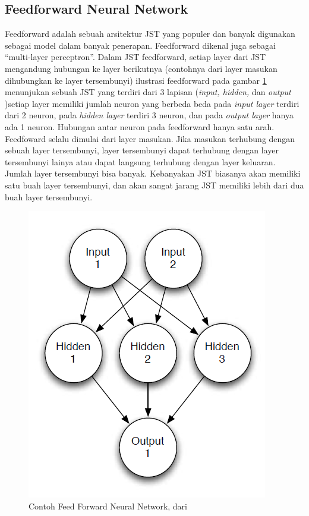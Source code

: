 \subsection{Feedforward Neural Network}
Feedforward adalah sebuah arsitektur JST yang populer dan banyak digunakan sebagai model dalam banyak penerapan. Feedforward dikenal juga sebagai ``multi-layer perceptron''. Dalam JST feedforward, setiap layer dari JST mengandung hubungan ke layer berikutnya (contohnya dari layer masukan dihubungkan ke layer tersembunyi) ilustrasi feedforward pada gambar \ref{fig:ffnn} menunjukan sebuah JST yang terdiri dari 3 lapisan (\textit{input, hidden,} dan \textit{output} )setiap layer memiliki jumlah neuron yang berbeda beda pada \textit{input layer} terdiri dari 2 neuron, pada \textit{hidden layer} terdiri 3 neuron, dan pada \textit{output layer} hanya ada 1 neuron. Hubungan antar neuron pada feedforward hanya satu arah. Feedfoward selalu dimulai dari layer masukan. Jika masukan terhubung dengan sebuah layer tersembunyi, layer tersembunyi dapat terhubung dengan layer tersembunyi lainya atau dapat langsung terhubung dengan layer keluaran. Jumlah layer tersembunyi bisa banyak. Kebanyakan JST biasanya akan memiliki satu buah layer tersembunyi, dan akan sangat jarang JST memiliki lebih dari dua buah layer tersembunyi.\\
\begin{figure}
	\centering
	\includegraphics[width=0.6\linewidth]{Gambar/mine/ffnn}
	\caption[Contoh Feed Forward Neural Network, dari \cite{IntroNNforJava:2015}]{Contoh Feed Forward Neural Network, dari \cite{IntroNNforJava:2015}} 
	\label{fig:ffnn}
	\end{figure}

